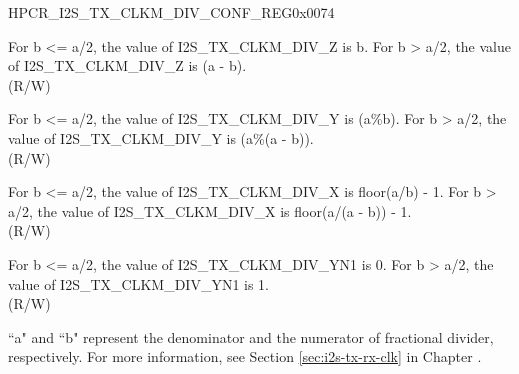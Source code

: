 \begin{register}{H}{PCR\_I2S\_TX\_CLKM\_DIV\_CONF\_REG}{0x0074}\label{regdesc:PCRI2STXCLKMDIVCONFREG}
%
%
%
%
%
\regnewline%
\begin{regdesc}\begin{reglist}
\label{fielddesc:PCRI2STXCLKMDIVZ}\item [PCR\_I2S\_TX\_CLKM\_DIV\_Z] For b <= a/2, the value of I2S\_TX\_CLKM\_DIV\_Z is b. For b > a/2, the value of I2S\_TX\_CLKM\_DIV\_Z is (a - b). \\ (R/W)
\label{fielddesc:PCRI2STXCLKMDIVY}\item [PCR\_I2S\_TX\_CLKM\_DIV\_Y] For b <= a/2, the value of I2S\_TX\_CLKM\_DIV\_Y is (a\%b). For b > a/2, the value of I2S\_TX\_CLKM\_DIV\_Y is (a\%(a - b)). \\ (R/W)
\label{fielddesc:PCRI2STXCLKMDIVX}\item [PCR\_I2S\_TX\_CLKM\_DIV\_X] For b <= a/2, the value of I2S\_TX\_CLKM\_DIV\_X is floor(a/b) - 1. For b > a/2, the value of I2S\_TX\_CLKM\_DIV\_X is floor(a/(a - b)) - 1. \\ (R/W)
\label{fielddesc:PCRI2STXCLKMDIVYN1}\item [PCR\_I2S\_TX\_CLKM\_DIV\_YN1] For b <= a/2, the value of I2S\_TX\_CLKM\_DIV\_YN1 is 0. For b > a/2, the value of I2S\_TX\_CLKM\_DIV\_YN1 is 1. \\ (R/W)
\end{reglist}\end{regdesc}
\vspace{-2em}
\begin{tiplisting}
``a" and ``b" represent the denominator and the numerator of fractional divider, respectively. For more information, see Section \ref{sec:i2s-tx-rx-clk} in Chapter \textit{}.
\end{tiplisting}
\end{register}


